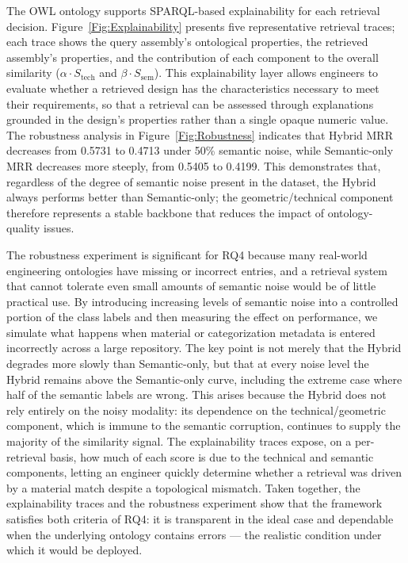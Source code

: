 \documentclass[preprint,12pt]{elsarticle}
\begin{document}
The OWL ontology supports SPARQL-based explainability for each retrieval decision.
Figure~\ref{Fig:Explainability} presents five representative retrieval traces; each trace shows the query assembly's ontological properties, the retrieved assembly's properties, and the contribution of each component to the overall similarity ($\alpha \cdot S_{\text{tech}}$ and $\beta \cdot S_{\text{sem}}$).
This explainability layer allows engineers to evaluate whether a retrieved design has the characteristics necessary to meet their requirements, so that a retrieval can be assessed through explanations grounded in the design's properties rather than a single opaque numeric value.
The robustness analysis in Figure~\ref{Fig:Robustness} indicates that Hybrid MRR decreases from 0.5731 to 0.4713 under 50\% semantic noise, while Semantic-only MRR decreases more steeply, from 0.5405 to 0.4199.
This demonstrates that, regardless of the degree of semantic noise present in the dataset, the Hybrid always performs better than Semantic-only; the geometric/technical component therefore represents a stable backbone that reduces the impact of ontology-quality issues.

The robustness experiment is significant for RQ4 because many real-world engineering ontologies have missing or incorrect entries, and a retrieval system that cannot tolerate even small amounts of semantic noise would be of little practical use.
By introducing increasing levels of semantic noise into a controlled portion of the class labels and then measuring the effect on performance, we simulate what happens when material or categorization metadata is entered incorrectly across a large repository.
The key point is not merely that the Hybrid degrades more slowly than Semantic-only, but that at every noise level the Hybrid remains above the Semantic-only curve, including the extreme case where half of the semantic labels are wrong.
This arises because the Hybrid does not rely entirely on the noisy modality: its dependence on the technical/geometric component, which is immune to the semantic corruption, continues to supply the majority of the similarity signal.
The explainability traces expose, on a per-retrieval basis, how much of each score is due to the technical and semantic components, letting an engineer quickly determine whether a retrieval was driven by a material match despite a topological mismatch.
Taken together, the explainability traces and the robustness experiment show that the framework satisfies both criteria of RQ4: it is transparent in the ideal case and dependable when the underlying ontology contains errors --- the realistic condition under which it would be deployed.
\end{document}
